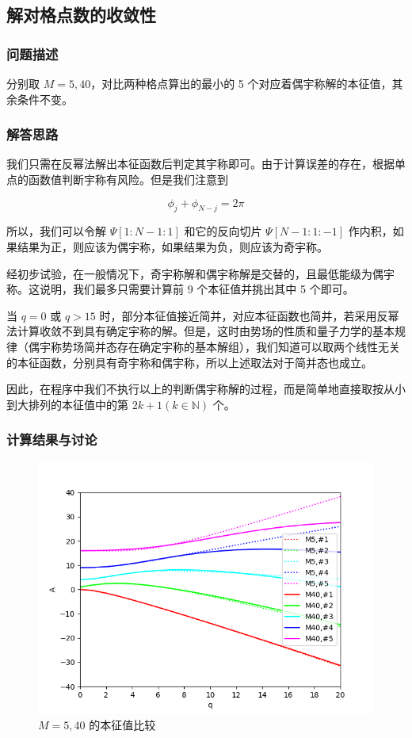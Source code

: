 \documentclass{ctexart}
\begin{document}
\subsection{解对格点数的收敛性}
\subsubsection{问题描述}
分别取 $M=5,40$，对比两种格点算出的最小的 5 个对应着偶宇称解的本征值，其余条件不变。
\subsubsection{解答思路}
我们只需在反幂法解出本征函数后判定其宇称即可。由于计算误差的存在，根据单点的函数值判断宇称有风险。但是我们注意到

$$
\phi_j+\phi_{N-j}=2\pi
$$

所以，我们可以令解 $\Psi[1:N-1:1]$ 和它的反向切片 $\Psi[N-1:1:-1]$ 作内积，如果结果为正，则应该为偶宇称，如果结果为负，则应该为奇宇称。

经初步试验，在一般情况下，奇宇称解和偶宇称解是交替的，且最低能级为偶宇称。这说明，我们最多只需要计算前 9 个本征值并挑出其中 5 个即可。

当 $q=0$ 或 $q>15$ 时，部分本征值接近简并，对应本征函数也简并，若采用反幂法计算收敛不到具有确定宇称的解。但是，这时由势场的性质和量子力学的基本规律（偶宇称势场简并态存在确定宇称的基本解组），我们知道可以取两个线性无关的本征函数，分别具有奇宇称和偶宇称，所以上述取法对于简并态也成立。

因此，在程序中我们不执行以上的判断偶宇称解的过程，而是简单地直接取按从小到大排列的本征值中的第 $2k+1(k\in \mathbb N)$ 个。
\subsubsection{计算结果与讨论}

\begin{figure}
\centering
\includegraphics[scale=0.6]{5vs40.png}
\caption{$M=5,40$ 的本征值比较}
\end{figure}
\end{document}
